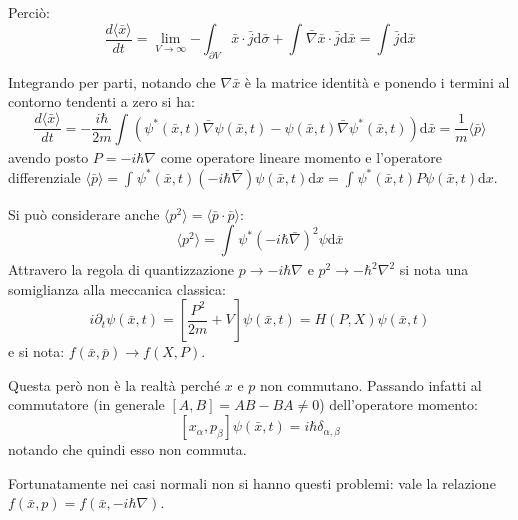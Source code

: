 Perciò:
\begin{equation}
\frac{d\langle \bar x\rangle}{dt}=\lim_{V\to \infty}{-\int_{\partial V}^{}{\bar x\cdot \bar j \textrm{d}\bar \sigma}+\int_{}^{}{\bar \nabla \bar x\cdot \bar j \textrm{d}\bar x}}=\int_{}^{}{\bar j \textrm{d}\bar x}
\end{equation}

Integrando per parti, notando che $\nabla \bar x$ è la matrice identità e ponendo i termini al contorno tendenti a zero si ha:
\begin{equation}
\frac{d\langle \bar x\rangle}{dt}=-\frac{i\hbar }{2m}\int_{}^{}{\left(\psi ^*\left(\bar x,t\right)\bar \nabla \psi\left(\bar x,t\right) -\psi\left(\bar x,t\right) \bar \nabla \psi ^*\left(\bar x,t\right)\right) \textrm{d}\bar x}=\frac{1}{m}\langle \bar p\rangle
\end{equation}
avendo posto $P=-i\hbar\nabla$ come operatore lineare momento e l'operatore differenziale $\langle \bar p \rangle=\int_{}^{}{\psi ^*\left(\bar x,t\right)\left(-i\hbar \bar \nabla \right)\psi \left(\bar x,t\right)\textrm{d}x}=\int_{}^{}{\psi ^*\left(\bar x,t\right)P\psi \left(\bar x,t\right) \textrm{d}x}$.

Si può considerare anche $\langle p^2\rangle=\langle \bar p \cdot \bar p \rangle$:
\begin{equation}
\langle p^2 \rangle=\int_{}^{}{\psi ^*\left(-i\hbar \bar \nabla \right)^2 \psi  \textrm{d}\bar x}
\end{equation}
Attravero la regola di quantizzazione $p\rightarrow -i\hbar\nabla$ e $p^2\rightarrow -\hbar^2\nabla^2$ si nota una somiglianza alla meccanica classica:
\begin{equation}
i\partial _t\psi \left(\bar x,t\right) =\left[\frac{P^2}{2m}+V\right]\psi \left(\bar x,t\right) =H\left(P,X\right)\psi \left(\bar x,t\right)
\end{equation}
e si nota: $f\left(\bar x,\bar p\right) \rightarrow f\left(X,P\right)$.

Questa però non è la realtà perché $x$ e $p$ non commutano. Passando infatti al commutatore (in generale $[A,B]=AB-BA \neq 0$) dell'operatore momento:
\begin{equation}
\left[x_\alpha ,p_\beta \right]\psi \left(\bar x,t\right) =i\hbar \delta _{\alpha ,\beta }
\end{equation}
notando che quindi esso non commuta.

Fortunatamente nei casi normali non si hanno questi problemi: vale la relazione $f(\bar x,p)=f(\bar x, -i\hbar\nabla)$.

